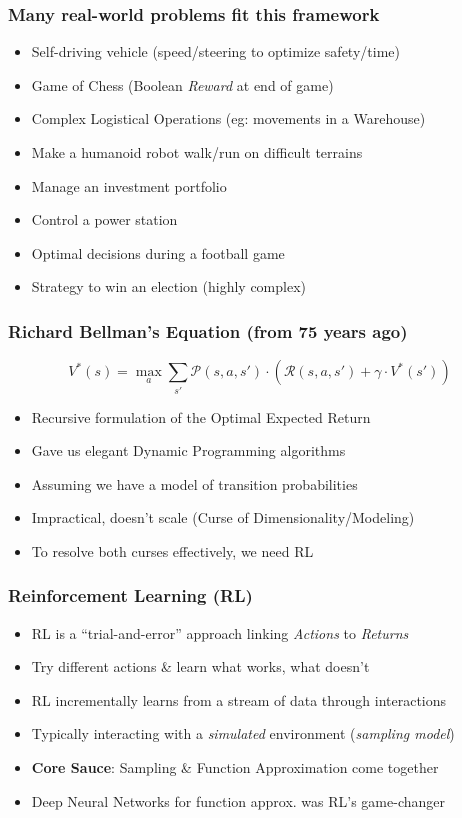 \documentclass[handout]{beamer}
\begin{document}
\begin{frame}
\frametitle{Many real-world problems fit this framework}
\pause
\begin{itemize}[<+->]
\item Self-driving vehicle (speed/steering to optimize safety/time)
\item Game of Chess (Boolean {\em Reward} at end of game)
\item Complex Logistical Operations (eg: movements in a Warehouse)
\item Make a humanoid robot walk/run on difficult terrains
\item Manage an investment portfolio
\item Control a power station
\item Optimal decisions during a football game
\item Strategy to win an election (highly complex)
\end{itemize}
\end{frame}


\begin{frame}
\frametitle{Richard Bellman's Equation (from 75 years ago)}
\pause
$$V^*(s) = \max_a  \sum_{s'} \mathcal{P}(s,a,s') \cdot (\mathcal{R}(s,a,s') + \gamma \cdot V^*(s'))$$
\begin{itemize}[<+->]
\item Recursive formulation of the Optimal Expected Return
\item Gave us elegant Dynamic Programming algorithms
\item Assuming we have a model of transition probabilities
\item Impractical, doesn't scale (Curse of Dimensionality/Modeling)
\item To resolve both curses effectively, we need RL
\end{itemize}
\end{frame}

\begin{frame}
\frametitle{Reinforcement Learning (RL)}
\pause
\begin{itemize}[<+->]

\item RL is a ``trial-and-error'' approach linking {\em Actions} to {\em Returns}
\item Try different actions \& learn what works, what doesn't
\item RL incrementally learns from a stream of data through interactions
\item Typically interacting with a {\em simulated} environment ({\em sampling model})
\item {\bf Core Sauce}: Sampling \& Function Approximation come together
\item Deep Neural Networks for function approx. was RL's game-changer
\end{itemize}
\end{frame}
\end{document}
